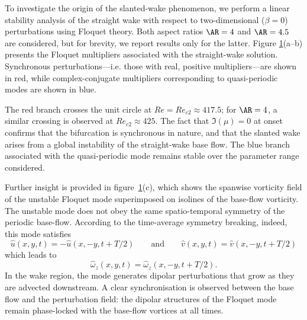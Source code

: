 \begin{figure}
\label{fig:AR4p5_modes_Re430_beta0}
\end{figure}

To investigate the origin of the slanted-wake phenomenon, we perform a linear stability analysis of the straight wake with respect to two-dimensional ($\beta=0$) perturbations using Floquet theory. Both aspect ratios $\AR=4$ and $\AR=4.5$ are considered, but for brevity, we report results only for the latter. Figure \ref{fig:AR4p5_modes_Re430_beta0}(a--b) presents the Floquet multipliers associated with the straight-wake solution. Synchronous perturbations---i.e. those with real, positive multipliers---are shown in red, while complex-conjugate multipliers corresponding to quasi-periodic modes are shown in blue.

The red branch crosses the unit circle at $Re=Re_{c2} \approx 417.5$; for $\AR=4$, a similar crossing is observed at $Re_{c2} \approx 425$. The fact that $\Im(\mu) = 0$ at onset confirms that the bifurcation is synchronous in nature, and that the slanted wake arises from a global instability of the straight-wake base flow. The blue branch associated with the quasi-periodic mode remains stable over the parameter range considered.

Further insight is provided in figure~\ref{fig:AR4p5_modes_Re430_beta0}(c), which shows the spanwise vorticity field of the unstable Floquet mode superimposed on isolines of the base-flow vorticity. The unstable mode does not obey the same spatio-temporal symmetry of the periodic base-flow. According to the time-average symmetry breaking, indeed, this mode satisfies
%
\begin{equation}
  \hat{u}(x,y,t) = - \hat{u}(x,-y,t+T/2) \qquad \text{and} \qquad \hat{v}(x,y,t) = \hat{v}(x,-y,t+T/2)
\end{equation}
%
which leads to
%
\begin{equation}
  \hat{\omega}_z(x,y,t) = \hat{\omega}_z(x,-y,t+T/2).
\end{equation}
%
In the wake region, the mode generates dipolar perturbations that grow as they are advected downstream. A clear synchronisation is observed between the base flow and the perturbation field: the dipolar structures of the Floquet mode remain phase-locked with the base-flow vortices at all times.

